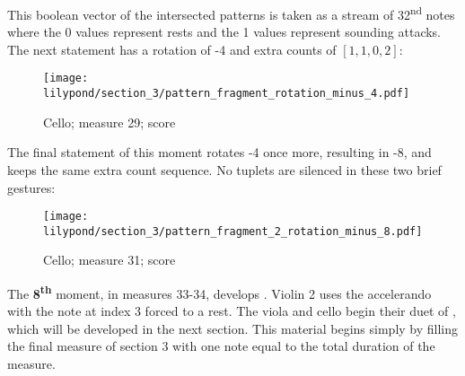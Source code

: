 This boolean vector of the intersected patterns is taken as a stream of 32\textsuperscript{nd} notes where the 0 values represent rests and the 1 values represent sounding attacks. The next statement has a rotation of -4 and extra counts of $[1, 1, 0, 2]$:


\setcounter{figure}{21}
\setcounter{subFigure}{0}
\renewcommand{\thefigure}{\thechapter.\arabic{figure}}
\begin{figure}[H]
    \texttt{[image: lilypond/section\_3/pattern\_fragment\_rotation\_minus\_4.pdf]}
    \caption{Cello; measure 29; score}
    \label{fig:section-3-pattern-minus-4}
\end{figure}

The final statement of this moment rotates -4 once more, resulting in -8, and keeps the same extra count sequence. No tuplets are silenced in these two brief gestures:


\setcounter{figure}{22}
\setcounter{subFigure}{0}
\renewcommand{\thefigure}{\thechapter.\arabic{figure}}
\begin{figure}[H]
    \texttt{[image: lilypond/section\_3/pattern\_fragment\_2\_rotation\_minus\_8.pdf]}
    \caption{Cello; measure 31; score}
    \label{fig:section-3-pattern-minus-8}
\end{figure}

The \textbf{8\textsuperscript{th}} moment, in measures 33-34, develops . Violin 2 uses the  accelerando with the note at index 3 forced to a rest. The viola and cello begin their duet of , which will be developed in the next section. This material begins simply by filling the final measure of section 3 with one note equal to the total duration of the measure.

